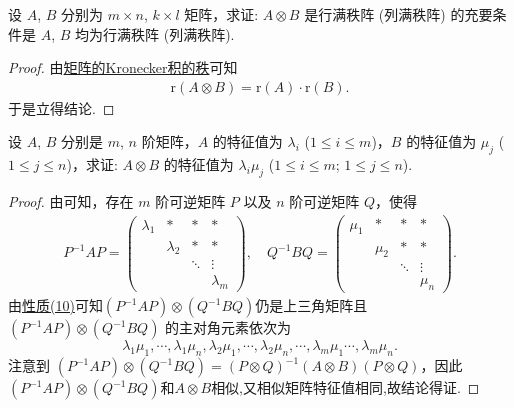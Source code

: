 \documentclass[../../main.tex]{subfiles}
\begin{document}
\begin{corollary}\label{corollary:矩阵的Kronecker积关于行列满秩阵的推论}
设 $A$, $B$ 分别为 $m\times n$, $k\times l$ 矩阵，求证: $A\otimes B$ 是行满秩阵 (列满秩阵) 的充要条件是 $A$, $B$ 均为行满秩阵 (列满秩阵). 
\end{corollary}
\begin{proof}
由\hyperref[proposition:矩阵的Kronecker积的秩]{矩阵的Kronecker积的秩}可知
\begin{align*}
\mathrm{r}\left( A\otimes B \right) =\mathrm{r}\left( A \right) \cdot \mathrm{r}\left( B \right) .
\end{align*}
于是立得结论.

\end{proof}

\begin{proposition}[矩阵的Kronecker积的特征值]\label{proposition:矩阵的Kronecker积的特征值}
设 $A$, $B$ 分别是 $m$, $n$ 阶矩阵，$A$ 的特征值为 $\lambda_i$ ($1\leqslant  i\leqslant  m$)，$B$ 的特征值为 $\mu_j$ ($1\leqslant  j\leqslant  n$)，求证: $A\otimes B$ 的特征值为 $\lambda_i\mu_j$ ($1\leqslant  i\leqslant  m$; $1\leqslant  j\leqslant  n$).
\end{proposition}
\begin{proof}
由可知，存在 $m$ 阶可逆矩阵 $P$ 以及 $n$ 阶可逆矩阵 $Q$，使得
\begin{align*}
P^{-1}AP = 
\begin{pmatrix}
\lambda_1 & * & * & * \\
& \lambda_2 & * & * \\
& & \ddots & \vdots \\
& & & \lambda_m
\end{pmatrix}, \quad 
Q^{-1}BQ = 
\begin{pmatrix}
\mu_1 & * & * & * \\
& \mu_2 & * & * \\
& & \ddots & \vdots \\
& & & \mu_n
\end{pmatrix}.
\end{align*}
由\hyperref[矩阵的Kronecker积的基本性质(10)]{性质(10)}可知$(P^{-1}AP)\otimes (Q^{-1}BQ)$仍是上三角矩阵且 $(P^{-1}AP)\otimes (Q^{-1}BQ)$ 的主对角元素依次为
\[
\lambda_1\mu_1,\cdots,\lambda_1\mu_n,\lambda_2\mu_1,\cdots,\lambda_2\mu_n,\cdots,\lambda_m\mu_1\cdots,\lambda_m\mu_n.
\]
注意到 $(P^{-1}AP)\otimes (Q^{-1}BQ)=(P\otimes Q)^{-1}(A\otimes B)(P\otimes Q)$，因此$(P^{-1}AP)\otimes (Q^{-1}BQ)$和$A\otimes B$相似,又相似矩阵特征值相同,故结论得证.

\end{proof}
\end{document}
